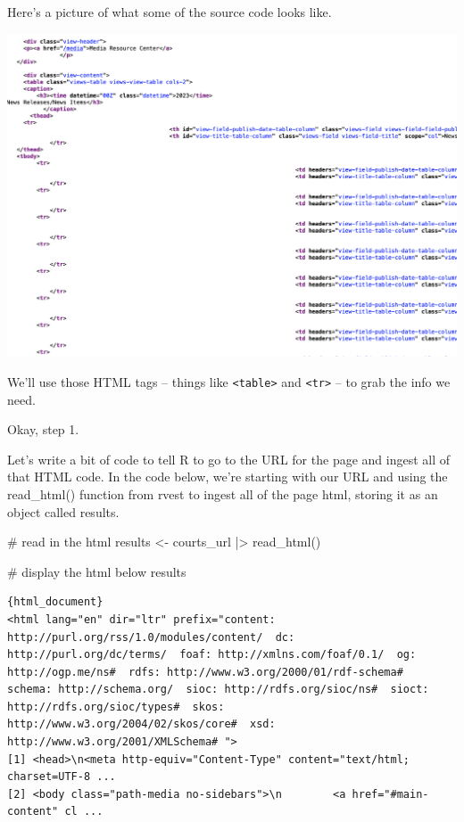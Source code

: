 \documentclass[
  letterpaper,
  DIV=11,
  numbers=noendperiod]{scrreprt}
\newenvironment{Shaded}{\begin{snugshade}}{\end{snugshade}}
\newcommand{\CommentTok}[1]{\textcolor[rgb]{0.37,0.37,0.37}{#1}}
\newcommand{\FunctionTok}[1]{\textcolor[rgb]{0.28,0.35,0.67}{#1}}
\newcommand{\NormalTok}[1]{\textcolor[rgb]{0.00,0.23,0.31}{#1}}
\newcommand{\OtherTok}[1]{\textcolor[rgb]{0.00,0.23,0.31}{#1}}
\newcommand{\SpecialCharTok}[1]{\textcolor[rgb]{0.37,0.37,0.37}{#1}}
\begin{document}
Here's a picture of what some of the source code looks like.

\includegraphics[width=7.08in,height=\textheight]{./images/rvest2.png}

We'll use those HTML tags -- things like
\texttt{\textless{}table\textgreater{}} and
\texttt{\textless{}tr\textgreater{}} -- to grab the info we need.

Okay, step 1.

Let's write a bit of code to tell R to go to the URL for the page and
ingest all of that HTML code. In the code below, we're starting with our
URL and using the read\_html() function from rvest to ingest all of the
page html, storing it as an object called results.

\begin{Shaded}
\begin{Highlighting}[]
\CommentTok{\# read in the html}
\NormalTok{results }\OtherTok{\textless{}{-}}\NormalTok{ courts\_url }\SpecialCharTok{|\textgreater{}}
  \FunctionTok{read\_html}\NormalTok{()}

\CommentTok{\# display the html below}
\NormalTok{results}
\end{Highlighting}
\end{Shaded}

\begin{verbatim}
{html_document}
<html lang="en" dir="ltr" prefix="content: http://purl.org/rss/1.0/modules/content/  dc: http://purl.org/dc/terms/  foaf: http://xmlns.com/foaf/0.1/  og: http://ogp.me/ns#  rdfs: http://www.w3.org/2000/01/rdf-schema#  schema: http://schema.org/  sioc: http://rdfs.org/sioc/ns#  sioct: http://rdfs.org/sioc/types#  skos: http://www.w3.org/2004/02/skos/core#  xsd: http://www.w3.org/2001/XMLSchema# ">
[1] <head>\n<meta http-equiv="Content-Type" content="text/html; charset=UTF-8 ...
[2] <body class="path-media no-sidebars">\n        <a href="#main-content" cl ...
\end{verbatim}
\end{document}
